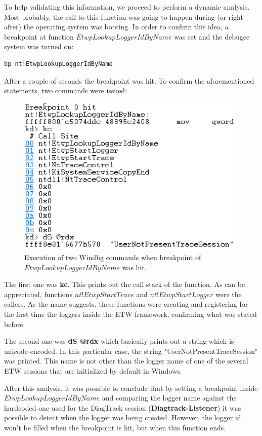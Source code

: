 To help validating this information, we proceed to perform a dynamic analysis. Most probably, the call to this function was going to happen during (or right after) the operating system was booting. In order to confirm this idea, a breakpoint at function $EtwpLookupLoggerIdByName$ was set and the debugee system was turned on: 

\begin{lstlisting}
bp nt!EtwpLookupLoggerIdByName
\end{lstlisting}

After a couple of seconds the breakpoint was hit. To confirm the aforementioned statements, two commands were issued: 

\begin{figure}[H]
  \includegraphics[width=11cm]{images/automation/loggerid/kc_and_rdx.png}
  \caption[]{Execution of two Windbg commands when breakpoint of $EtwpLookupLoggerIdByName$ was hit. }
  \label{fig:logger_id_kc_ds}
\end{figure}
The first one was {\bfseries kc}. This prints out the call stack of the function. As can be appreciated, functions $nt!EtwpStartTrace$ and $nt!EtwpStartLogger$ were the callers. As the name suggests, these functions were creating and registering for the first time the loggers inside the ETW framework, confirming what was stated before. 

The second one was {\bfseries dS @rdx} which basically prints out a string which is unicode-encoded. In this particular case, the string "UserNotPresentTraceSession" was printed. This name is not other than the logger name of one of the several ETW sessions that are initialized by default in Windows. 

After this analysis, it was possible to conclude that by setting a breakpoint inside $EtwpLookupLoggerIdByName$ and comparing the logger name against the hardcoded one used for the DiagTrack session ({\bfseries Diagtrack-Listener}) it was possible to detect when the logger was being created. However, the logger id won't be filled when the breakpoint is hit, but when this function ends. 

